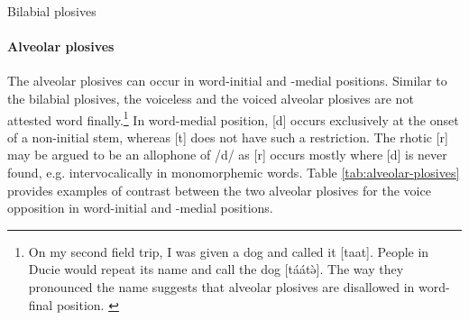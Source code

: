 \begin{table}[thb]
\centering
\caption{Bilabial plosives \label{tab:bilabial-plosives}}


\quad
{}

\end{table}





\paragraph{Alveolar plosives}
\label{sec:PHO-alveo-plos}  

The alveolar plosives can occur in word-initial and  -medial positions. Similar
to the bilabial plosives, the voiceless and the voiced alveolar plosives  are
not attested word finally.\footnote{On my second field trip, I was given a dog
and  called it [taat]. People in Ducie would repeat its name and call the dog
[táátə̀]. The way they pronounced the name suggests that alveolar plosives are
disallowed in word-final position. \label{fn:taat-epenthesis}}  In word-medial
position,  [d] occurs exclusively  at the onset of a non-initial stem, whereas 
[t] does not have such a restriction.  The rhotic [r] may be argued to be an
allophone of /d/ as   [r] occurs mostly where [d] is never found, e.g. 
intervocalically in monomorphemic words. Table
\ref{tab:alveolar-plosives} provides examples
of contrast between the two alveolar plosives for the {\sc voice} opposition in
word-initial and
 -medial 
positions.


